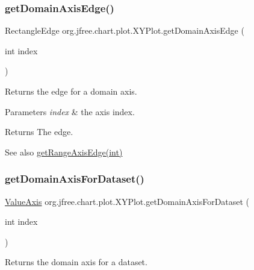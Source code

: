 \subsubsection{\texorpdfstring{get\+Domain\+Axis\+Edge()}{getDomainAxisEdge()}\hspace{0.1cm}{\footnotesize\ttfamily [2/2]}}
{\footnotesize\ttfamily Rectangle\+Edge org.\+jfree.\+chart.\+plot.\+X\+Y\+Plot.\+get\+Domain\+Axis\+Edge (\begin{DoxyParamCaption}\item[{int}]{index }\end{DoxyParamCaption})}

Returns the edge for a domain axis.


\begin{DoxyParams}{Parameters}
{\em index} & the axis index.\\
\hline
\end{DoxyParams}
\begin{DoxyReturn}{Returns}
The edge.
\end{DoxyReturn}
\begin{DoxySeeAlso}{See also}
\mbox{\hyperlink{classorg_1_1jfree_1_1chart_1_1plot_1_1_x_y_plot_a625b18ac16110da5e9dd366dacbeb529}{get\+Range\+Axis\+Edge(int)}} 
\end{DoxySeeAlso}
\mbox{\label{classorg_1_1jfree_1_1chart_1_1plot_1_1_x_y_plot_a78335ba6961d17e7f85b3f780caad54f}} 
\subsubsection{\texorpdfstring{get\+Domain\+Axis\+For\+Dataset()}{getDomainAxisForDataset()}}
{\footnotesize\ttfamily \mbox{\hyperlink{classorg_1_1jfree_1_1chart_1_1axis_1_1_value_axis}{Value\+Axis}} org.\+jfree.\+chart.\+plot.\+X\+Y\+Plot.\+get\+Domain\+Axis\+For\+Dataset (\begin{DoxyParamCaption}\item[{int}]{index }\end{DoxyParamCaption})}

Returns the domain axis for a dataset.


